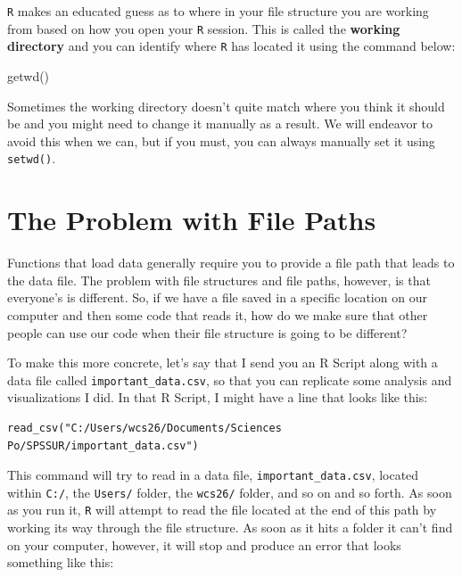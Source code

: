 \documentclass[
  letterpaper,
]{book}
\newenvironment{Shaded}{\begin{snugshade}}{\end{snugshade}}
\newcommand{\FunctionTok}[1]{\textcolor[rgb]{0.28,0.35,0.67}{#1}}
\newcommand{\NormalTok}[1]{\textcolor[rgb]{0.00,0.23,0.31}{#1}}
\begin{document}
\texttt{R} makes an educated guess as to where in your file structure
you are working from based on how you open your \texttt{R} session. This
is called the \textbf{working directory} and you can identify where
\texttt{R} has located it using the command below:

\begin{Shaded}
\begin{Highlighting}[]
\FunctionTok{getwd}\NormalTok{()}
\end{Highlighting}
\end{Shaded}

Sometimes the working directory doesn't quite match where you think it
should be and you might need to change it manually as a result. We will
endeavor to avoid this when we can, but if you must, you can always
manually set it using \texttt{setwd()}.

\hypertarget{the-problem-with-file-paths}{%
\section{The Problem with File
Paths}\label{the-problem-with-file-paths}}

Functions that load data generally require you to provide a file path
that leads to the data file. The problem with file structures and file
paths, however, is that everyone's is different. So, if we have a file
saved in a specific location on our computer and then some code that
reads it, how do we make sure that other people can use our code when
their file structure is going to be different?

To make this more concrete, let's say that I send you an R Script along
with a data file called \texttt{important\_data.csv}, so that you can
replicate some analysis and visualizations I did. In that R Script, I
might have a line that looks like this:

\begin{verbatim}
read_csv("C:/Users/wcs26/Documents/Sciences Po/SPSSUR/important_data.csv")
\end{verbatim}

This command will try to read in a data file,
\texttt{important\_data.csv}, located within \texttt{C:/}, the
\texttt{Users/} folder, the \texttt{wcs26/} folder, and so on and so
forth. As soon as you run it, \texttt{R} will attempt to read the file
located at the end of this path by working its way through the file
structure. As soon as it hits a folder it can't find on your computer,
however, it will stop and produce an error that looks something like
this:
\end{document}
